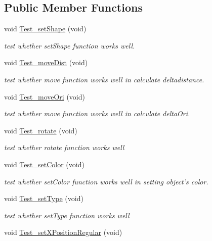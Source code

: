 \subsection*{Public Member Functions}
\begin{DoxyCompactItemize}
\item 
void \hyperlink{classObjectTests_a85cdff21ccdcde04467372ae3abab902}{Test\-\_\-set\-Shape} (void)
\begin{DoxyCompactList}\small\item\em test whether set\-Shape function works well. \end{DoxyCompactList}\item 
void \hyperlink{classObjectTests_a65ea2e4d100fafec3dae904b4388c30e}{Test\-\_\-move\-Dist} (void)
\begin{DoxyCompactList}\small\item\em test whether move function works well in calculate deltadistance. \end{DoxyCompactList}\item 
void \hyperlink{classObjectTests_a2dbc3484f891810c18b831d326a3fdac}{Test\-\_\-move\-Ori} (void)
\begin{DoxyCompactList}\small\item\em test whether move function works well in calculate delta\-Ori. \end{DoxyCompactList}\item 
void \hyperlink{classObjectTests_a6deb7c9f475754e836f23edd17a11e51}{Test\-\_\-rotate} (void)
\begin{DoxyCompactList}\small\item\em test whether rotate function works well \end{DoxyCompactList}\item 
void \hyperlink{classObjectTests_a47b3e74691b343e097d5e0bbddc2e8c3}{Test\-\_\-set\-Color} (void)
\begin{DoxyCompactList}\small\item\em test whether set\-Color function works well in setting object's color. \end{DoxyCompactList}\item 
void \hyperlink{classObjectTests_ae0fc1474d18ba57a69660ac6e60f27f1}{Test\-\_\-set\-Type} (void)
\begin{DoxyCompactList}\small\item\em test whether set\-Type function works well \end{DoxyCompactList}\item 
void \hyperlink{classObjectTests_a7438b8610b6dc1b8eba65110f596a5d6}{Test\-\_\-set\-X\-Position\-Regular} (void)

\end{DoxyCompactItemize}
